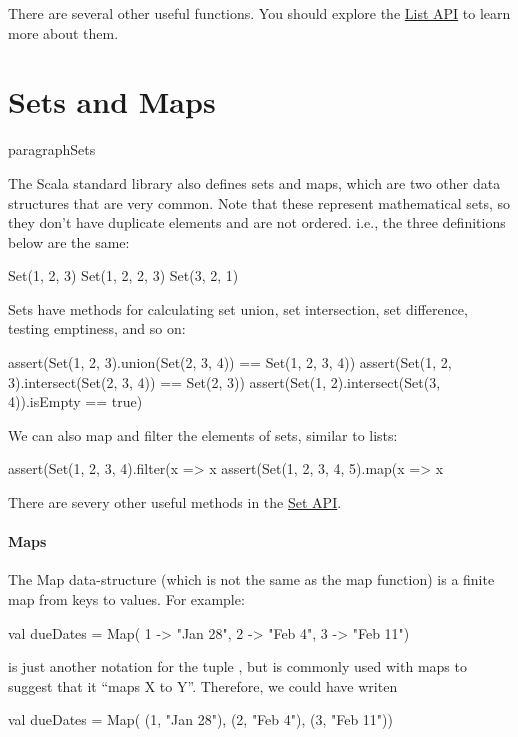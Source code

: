 \documentclass{book}
\begin{document}
There are several other useful functions. You should explore the
\href{http://www.scala-lang.org/api/2.11.7/index.html#scala.collection.immutable.List}{List API} to learn more about them.

\section{Sets and Maps}

paragraph{Sets}

The Scala standard library also defines sets and maps, which are two other data
structures that are very common. Note that these represent mathematical sets, so
they don't have duplicate elements and are not ordered. i.e., the three
definitions below are the same:
%
\begin{scalacode}
Set(1, 2, 3)
Set(1, 2, 2, 3)
Set(3, 2, 1)
\end{scalacode}

Sets have methods for calculating set union, set intersection, set difference,
testing emptiness, and so on:
%
\begin{scalacode}
assert(Set(1, 2, 3).union(Set(2, 3, 4)) == Set(1, 2, 3, 4))
assert(Set(1, 2, 3).intersect(Set(2, 3, 4)) == Set(2, 3))
assert(Set(1, 2).intersect(Set(3, 4)).isEmpty == true)
\end{scalacode}

We can also map and filter the elements of sets, similar to lists:
%
\begin{scalacode}
assert(Set(1, 2, 3, 4).filter(x => x %
assert(Set(1, 2, 3, 4, 5).map(x => x %
\end{scalacode}

There are severy other useful methods in the
\href{http://www.scala-lang.org/api/2.11.7/index.html#scala.collection.immutable.Set}{Set API}.

\paragraph{Maps}
The Map data-structure (which is not the same as the map function) is a finite
map from keys to values. For example:
%
\begin{scalacode}
val dueDates = Map(
  1 -> "Jan 28",
  2 -> "Feb 4",
  3 -> "Feb 11")
\end{scalacode}

\begin{notation}
 is just another notation for the tuple
, but is commonly used with maps to suggest that it
``maps X to Y''. Therefore, we could have writen
\begin{scalacode}
val dueDates = Map(
  (1, "Jan 28"),
  (2, "Feb 4"),
  (3, "Feb 11"))
\end{scalacode}
\end{notation}
\end{document}
